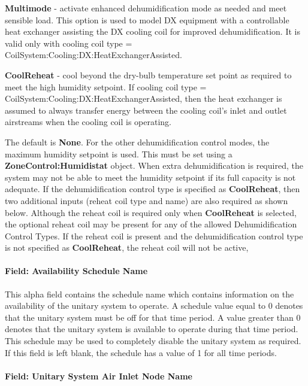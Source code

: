 \textbf{Multimode} - activate enhanced dehumidification mode as needed and meet sensible load. This option is used to model DX equipment with a controllable heat exchanger assisting the DX cooling coil for improved dehumidification. It is valid only with cooling coil type = CoilSystem:Cooling:DX:HeatExchangerAssisted.

\textbf{CoolReheat} - cool beyond the dry-bulb temperature set point as required to meet the high humidity setpoint. If cooling coil type = CoilSystem:Cooling:DX:HeatExchangerAssisted, then the heat exchanger is assumed to always transfer energy between the cooling coil's inlet and outlet airstreams when the cooling coil is operating.

The default is \textbf{None}. For the other dehumidification control modes, the maximum humidity setpoint is used. This must be set using a \textbf{ZoneControl:Humidistat} object. When extra dehumidification is required, the system may not be able to meet the humidity setpoint if its full capacity is not adequate. If the dehumidification control type is specified as \textbf{CoolReheat}, then two additional inputs (reheat coil type and name) are also required as shown below. Although the reheat coil is required only when \textbf{CoolReheat} is selected, the optional reheat coil may be present for any of the allowed Dehumidification Control Types. If the reheat coil is present and the dehumidification control type is not specified as \textbf{CoolReheat}, the reheat coil will not be active,

\paragraph{Field: Availability Schedule Name}\label{field-availability-schedule-name-017}

This alpha field contains the schedule name which contains information on the availability of the unitary system to operate. A schedule value equal to 0 denotes that the unitary system must be off for that time period. A value greater than 0 denotes that the unitary system is available to operate during that time period. This schedule may be used to completely disable the unitary system as required. If this field is left blank, the schedule has a value of 1 for all time periods.

\paragraph{Field: Unitary System Air Inlet Node Name}\label{field-unitary-system-air-inlet-node-name}

